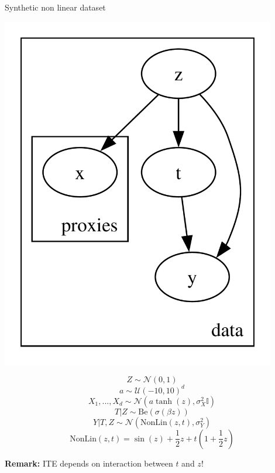\documentclass[10pt]{beamer}
\begin{document}
\begin{frame}{Synthetic non linear dataset}
    \begin{minipage}{0.48\textwidth}
    \includegraphics[width=0.9\textwidth]{images/pyro_model.pdf}
    \end{minipage}
    \begin{minipage}{0.48\textwidth}
    
        \begin{equation*}
        Z \sim \mathcal{N}(0,1)
        \end{equation*}
        \begin{equation*}
            a \sim \mathcal{U}(-10,10)^d
        \end{equation*}
        \begin{equation*}
        X_1,...,X_d \sim \mathcal{N}(a\tanh(z),\sigma_X^2\mathbb{I} )     
        \end{equation*}
        \begin{equation*}
        T | Z \sim \mathrm{Be}(\sigma(\beta z))    
        \end{equation*}
        \begin{equation*}
        Y|T,Z \sim \mathcal{N}\left(\text{NonLin}(z,t),\sigma_Y^2\right)           
        \end{equation*}
        \begin{equation*}
        \text{NonLin}(z,t) = \sin(z)+\frac12z+t\left(1+\frac12z\right)      
        \end{equation*}
    \end{minipage}
    \centering
    {\textbf{Remark:} ITE depends on interaction between $t$ and $z$!}
\end{frame}
\end{document}
